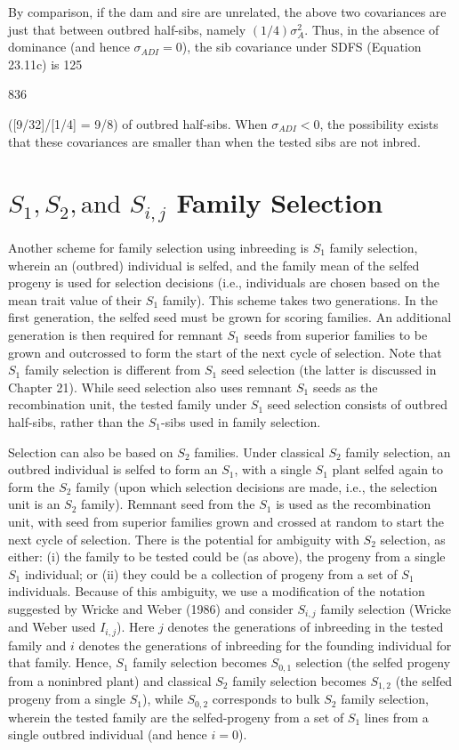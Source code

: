 \documentclass{article}
\begin{document}
By comparison, if the dam and sire are unrelated, the above two covariances are just that between outbred half-sibs, namely  $ (1/4)\sigma_A^2 $. Thus, in the absence of dominance (and hence  $ \sigma_{ADI} = 0 $), the sib covariance under SDFS (Equation 23.11c) is 125%

836

([9/32]/[1/4] = 9/8) of outbred half-sibs. When  $ \sigma_{ADI} < 0 $, the possibility exists that these covariances are smaller than when the tested sibs are not inbred.

\section{ $ S_{1}, S_{2}, \text{and } S_{i,j} $ Family Selection}
Another scheme for family selection using inbreeding is  $ S_1 $ family selection, wherein an (outbred) individual is selfed, and the family mean of the selfed progeny is used for selection decisions (i.e., individuals are chosen based on the mean trait value of their  $ S_1 $ family). This scheme takes two generations. In the first generation, the selfed seed must be grown for scoring families. An additional generation is then required for remnant  $ S_1 $ seeds from superior families to be grown and outcrossed to form the start of the next cycle of selection. Note that  $ S_1 $ family selection is different from  $ S_1 $ seed selection (the latter is discussed in Chapter 21). While seed selection also uses remnant  $ S_1 $ seeds as the recombination unit, the tested family under  $ S_1 $ seed selection consists of outbred half-sibs, rather than the  $ S_1 $-sibs used in family selection.

Selection can also be based on  $ S_2 $ families. Under classical  $ S_2 $ family selection, an outbred individual is selfed to form an  $ S_1 $, with a single  $ S_1 $ plant selfed again to form the  $ S_2 $ family (upon which selection decisions are made, i.e., the selection unit is an  $ S_2 $ family). Remnant seed from the  $ S_1 $ is used as the recombination unit, with seed from superior families grown and crossed at random to start the next cycle of selection. There is the potential for ambiguity with  $ S_2 $ selection, as either: (i) the family to be tested could be (as above), the progeny from a single  $ S_1 $ individual; or (ii) they could be a collection of progeny from a set of  $ S_1 $ individuals. Because of this ambiguity, we use a modification of the notation suggested by Wricke and Weber (1986) and consider  $ S_{i,j} $ family selection (Wricke and Weber used  $ I_{i,j} $). Here  $ j $ denotes the generations of inbreeding in the tested family and  $ i $ denotes the generations of inbreeding for the founding individual for that family. Hence,  $ S_1 $ family selection becomes  $ S_{0,1} $ selection (the selfed progeny from a noninbred plant) and classical  $ S_2 $ family selection becomes  $ S_{1,2} $ (the selfed progeny from a single  $ S_1 $), while  $ S_{0,2} $ corresponds to bulk  $ S_2 $ family selection, wherein the tested family are the selfed-progeny from a set of  $ S_1 $ lines from a single outbred individual (and hence  $ i = 0 $).
\end{document}
